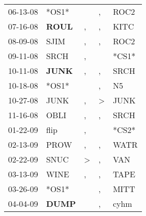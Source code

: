 \begin{supertabular}{p{0.07\textwidth}p{0.06\textwidth}p{0.02\textwidth}p{0.02\textwidth}p{0.06\textwidth}}
          06-13-08\textsuperscript{} &                            *OS1* &                  &                , &           ROC2\textsuperscript{} \\
          07-16-08\textsuperscript{} &  \textbf{ROUL\textsuperscript{}} &                , &                , &           KITC\textsuperscript{} \\
          08-09-08\textsuperscript{} &           SJIM\textsuperscript{} &                , &                , &           ROC2\textsuperscript{} \\
          09-11-08\textsuperscript{} &           SRCH\textsuperscript{} &                , &                  &                            *CS1* \\
          10-11-08\textsuperscript{} &  \textbf{JUNK\textsuperscript{}} &                , &                , &           SRCH\textsuperscript{} \\
          10-18-08\textsuperscript{} &                            *OS1* &                  &                , &             N5\textsuperscript{} \\
          10-27-08\textsuperscript{} &           JUNK\textsuperscript{} &                , &     \textgreater &           JUNK\textsuperscript{} \\
          11-16-08\textsuperscript{} &           OBLI\textsuperscript{} &                , &                , &           SRCH\textsuperscript{} \\
          01-22-09\textsuperscript{} &           flip\textsuperscript{} &                , &                  &                            *CS2* \\
          02-13-09\textsuperscript{} &           PROW\textsuperscript{} &                , &                , &           WATR\textsuperscript{} \\
          02-22-09\textsuperscript{} &           SNUC\textsuperscript{} &     \textgreater &                , &            VAN\textsuperscript{} \\
          03-13-09\textsuperscript{} &           WINE\textsuperscript{} &                , &                , &           TAPE\textsuperscript{} \\
          03-26-09\textsuperscript{} &                            *OS1* &                  &                , &           MITT\textsuperscript{} \\
          04-04-09\textsuperscript{} &  \textbf{DUMP\textsuperscript{}} &                  &                , &           cyhm\textsuperscript{} \\

\end{supertabular}
